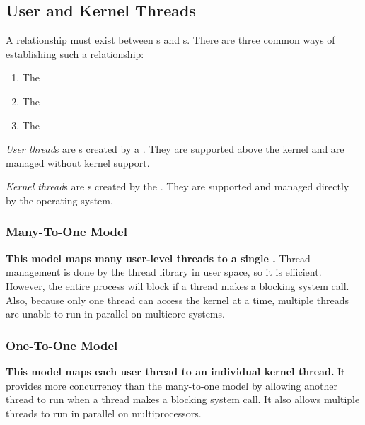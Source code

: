 \subsection{User and Kernel Threads}\label{subsec:User_Kernel_Threads}
A relationship must exist between s and s.
There are three common ways of establishing such a relationship:
\begin{enumerate}[noitemsep]
\item The 
\item The 
\item The 
\end{enumerate}

\begin{definition}\label{def:User_Thread}
  \emph{User thread}s are s created by a  .
  They are supported above the kernel and are managed without kernel support.
\end{definition}

\begin{definition}\label{def:Kernel_Thread}
  \emph{Kernel thread}s are s created by the .
  They are supported and managed directly by the operating system.
\end{definition}

\subsubsection{Many-To-One Model}\label{subsubsec:Many_To_One_Model}
\textbf{This model maps many user-level threads to a single .}
Thread management is done by the thread library in user space, so it is efficient.
However, the entire process will block if a thread makes a blocking system call.
Also, because only one thread can access the kernel at a time, multiple threads are unable to run in parallel on multicore systems.

\subsubsection{One-To-One Model}\label{subsubsec:One_To_One_Model}
\textbf{This model maps each user thread to an individual kernel thread.}
It provides more concurrency than the many-to-one model by allowing another thread to run when a thread makes a blocking system call.
It also allows multiple threads to run in parallel on multiprocessors.


